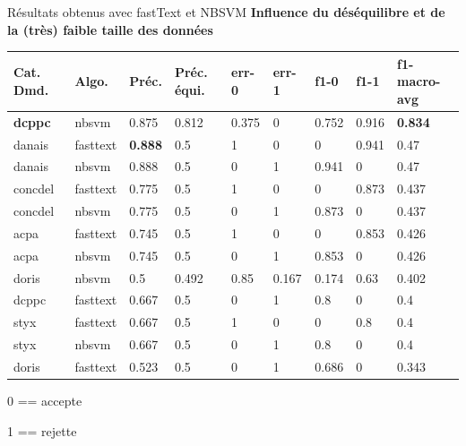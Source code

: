 \documentclass[newPxFont,pagenumber]{beamer}
\begin{document}
\begin{frame}{Résultats obtenus avec fastText et NBSVM}
\textbf{Influence du déséquilibre et de la (très) faible taille des données}
\begin{table}
\scriptsize
\begin{tabular}{|l|l|l|l|l|l|l|l|l|}
\hline
\textbf{Cat. Dmd.} & \textbf{Algo.} & \textbf{Préc.}   & \textbf{Préc. équi.} & \textbf{err-0} & \textbf{err-1} & \textbf{f1-0}  & \textbf{f1-1}  & \textbf{f1-macro-avg} \\ \hline
\textbf{dcppc}       & nbsvm      & 0.875 & 0.812        & 0.375 & 0     & 0.752 & 0.916 & \textbf{0.834}        \\ \hline
danais      & fasttext   & \textbf{0.888} & 0.5          & 1     & 0     & 0     & 0.941 & 0.47         \\ \hline
danais      & nbsvm      & 0.888 & 0.5          & 0     & 1     & 0.941 & 0     & 0.47         \\ \hline
concdel     & fasttext   & 0.775 & 0.5          & 1     & 0     & 0     & 0.873 & 0.437        \\ \hline
concdel     & nbsvm      & 0.775 & 0.5          & 0     & 1     & 0.873 & 0     & 0.437        \\ \hline
acpa        & fasttext   & 0.745 & 0.5          & 1     & 0     & 0     & 0.853 & 0.426        \\ \hline
acpa        & nbsvm      & 0.745 & 0.5          & 0     & 1     & 0.853 & 0     & 0.426        \\ \hline
doris       & nbsvm      & 0.5   & 0.492        & 0.85  & 0.167 & 0.174 & 0.63  & 0.402        \\ \hline
dcppc       & fasttext   & 0.667 & 0.5          & 0     & 1     & 0.8   & 0     & 0.4          \\ \hline
styx        & fasttext   & 0.667 & 0.5          & 1     & 0     & 0     & 0.8   & 0.4          \\ \hline
styx        & nbsvm      & 0.667 & 0.5          & 0     & 1     & 0.8   & 0     & 0.4          \\ \hline
doris       & fasttext   & 0.523 & 0.5          & 0     & 1     & 0.686 & 0     & 0.343        \\ \hline
\end{tabular}

\end{table}
0 == accepte

1 == rejette

\end{frame}
\end{document}
